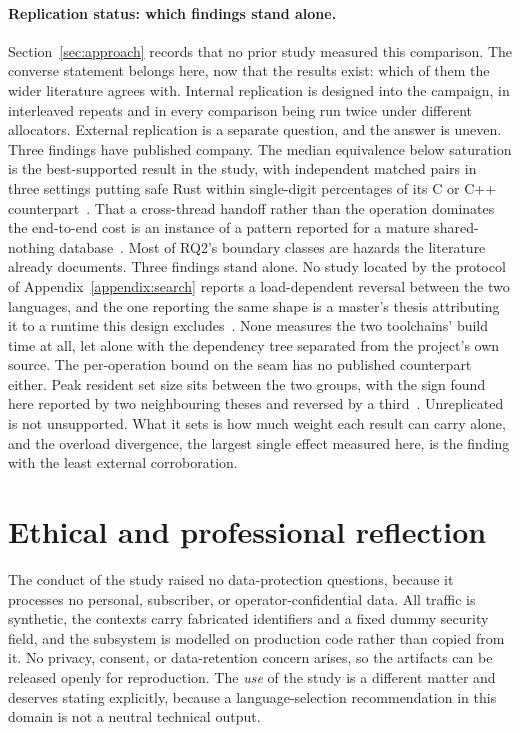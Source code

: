 \documentclass[english,oneside,a4paper,censored,csm,software-track-2020]{HYthesisML}
\begin{document}
\paragraph{Replication status: which findings stand alone.}
Section~\ref{sec:approach} records that no prior study measured this comparison. The converse
statement belongs here, now that the results exist: which of them the wider literature agrees with.
Internal replication is designed into the campaign, in \NRepeats{} interleaved repeats and in every
comparison being run twice under different allocators. External replication is a separate question,
and the answer is uneven. Three findings have published company. The median equivalence below
saturation is the best-supported result in the study, with independent matched pairs in three
settings putting safe Rust within single-digit percentages of its C or C++
counterpart~\cite{emmerich2019drivers,li2021ipc,gonzalez2023rustudp}. That a cross-thread handoff
rather than the operation dominates the end-to-end cost is an instance of a pattern reported for a
mature shared-nothing database~\cite{zhou2025oltp}. Most of RQ2's boundary classes are hazards the
literature already documents. Three findings stand alone. No study located by the protocol of
Appendix~\ref{appendix:search} reports a load-dependent reversal between the two languages, and the
one reporting the same shape is a master's thesis attributing it to a runtime this design
excludes~\cite{arvidsson2025async}. None measures the two toolchains' build time at all, let alone
with the dependency tree separated from the project's own source. The per-operation bound on the
seam has no published counterpart either. Peak resident set size sits between the two groups, with
the sign found here reported by two neighbouring theses and reversed by a
third~\cite{olsson2023ranmgmt,sundvisson2026drivers,karlback2021ran}. Unreplicated is not
unsupported. What it sets is how much weight each result can carry alone, and the overload
divergence, the largest single effect measured here, is the finding with the least external
corroboration.

\section{Ethical and professional reflection}
The conduct of the study raised no data-protection questions, because it processes no personal,
subscriber, or operator-confidential data. All traffic is synthetic, the contexts carry
fabricated identifiers and a fixed dummy security field, and the subsystem is modelled on
production code rather than copied from it. No privacy, consent, or data-retention concern
arises, so the artifacts can be released openly for
reproduction. The \emph{use} of the study is a different matter and deserves stating explicitly,
because a language-selection recommendation in this domain is not a neutral technical output.
\end{document}

